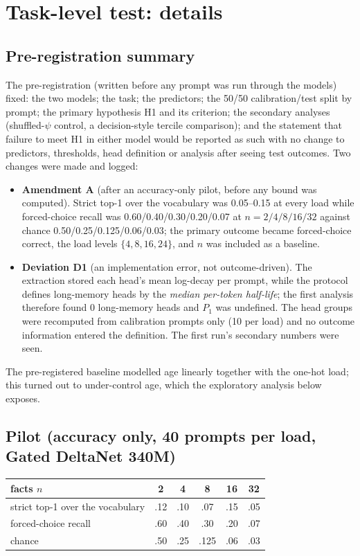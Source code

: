 \section{Task-level test: details}\label{app:task}
\subsection{Pre-registration summary}
The pre-registration (written before any prompt was run through the models) fixed: the two models; the task; the predictors; the 50/50 calibration/test split by prompt; the primary hypothesis H1 and its criterion; the secondary analyses (shuffled-$\psi$ control, a decision-style tercile comparison); and the statement that failure to meet H1 in either model would be reported as such with no change to predictors, thresholds, head definition or analysis after seeing test outcomes. Two changes were made and logged:
\begin{itemize}
  \item \textbf{Amendment A} (after an accuracy-only pilot, before any bound was computed). Strict top-1 over the vocabulary was 0.05--0.15 at every load while forced-choice recall was 0.60/0.40/0.30/0.20/0.07 at $n=2/4/8/16/32$ against chance 0.50/0.25/0.125/0.06/0.03; the primary outcome became forced-choice correct, the load levels $\{4,8,16,24\}$, and $n$ was included as a baseline.
  \item \textbf{Deviation D1} (an implementation error, not outcome-driven). The extraction stored each head's mean log-decay per prompt, while the protocol defines long-memory heads by the \emph{median per-token half-life}; the first analysis therefore found 0 long-memory heads and $P_1$ was undefined. The head groups were recomputed from calibration prompts only (10 per load) and no outcome information entered the definition. The first run's secondary numbers were seen.
\end{itemize}
The pre-registered baseline modelled age linearly together with the one-hot load; this turned out to under-control age, which the exploratory analysis below exposes.

\subsection{Pilot (accuracy only, 40 prompts per load, Gated DeltaNet 340M)}
\begin{table}[!htbp]
  \centering\scriptsize\setlength{\tabcolsep}{3.5pt}
  \begin{tabular}{lccccc}
    \toprule
    facts $n$ & 2 & 4 & 8 & 16 & 32 \\
    \midrule
    strict top-1 over the vocabulary & .12 & .10 & .07 & .15 & .05 \\
    forced-choice recall & .60 & .40 & .30 & .20 & .07 \\
    chance & .50 & .25 & .125 & .06 & .03 \\
    \bottomrule
  \end{tabular}
\end{table}

